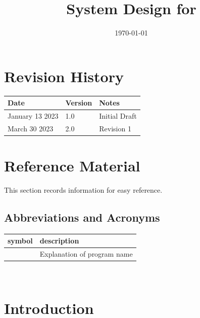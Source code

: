 \documentclass[12pt, titlepage]{article}
\begin{document}
	
	\title{System Design for \progname{}} 
	\author{\authname}
	\date{\today}
	
	\maketitle
	
	
	\section{Revision History}
	
	\begin{tabularx}{\textwidth}{p{3cm}p{2cm}X}
		\toprule {\bf Date} & {\bf Version} & {\bf Notes}\\
		\midrule
		January 13 2023 & 1.0 & Initial Draft\\
		\midrule
		March 30 2023 & 2.0 & Revision 1\\
		\bottomrule
	\end{tabularx}
	
	\newpage
	
	\section{Reference Material}
	
	This section records information for easy reference.
	
	\subsection{Abbreviations and Acronyms}
	
	\renewcommand{\arraystretch}{1.2}
	\begin{tabular}{l l} 
		\toprule		
		\textbf{symbol} & \textbf{description}\\
		\midrule 
		\progname & Explanation of program name\\
		\bottomrule
	\end{tabular}\\
	
	\newpage
	
	\tableofcontents
	
	\newpage
	
	\listoftables
	
	\listoffigures
	
	\newpage
	
	
	\section{Introduction}
	
\end{document}
